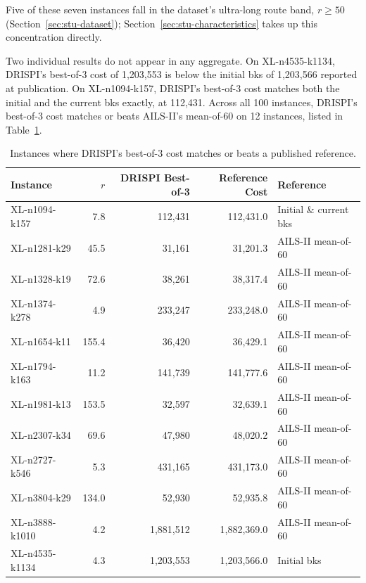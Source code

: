 Five of these seven instances fall in the dataset's ultra-long route band, $r \geq 50$ (Section~\ref{sec:stu-dataset}); Section~\ref{sec:stu-characteristics} takes up this concentration directly.

Two individual results do not appear in any aggregate. On XL-n4535-k1134, DRISPI's best-of-3 cost of 1,203,553 is below the initial \gls{bks} of 1,203,566 \citet{queirogaXLInstancesCapacitated2026} reported at publication. On XL-n1094-k157, DRISPI's best-of-3 cost matches both the initial and the current \gls{bks} exactly, at 112,431. Across all 100 instances, DRISPI's best-of-3 cost matches or beats AILS-II's mean-of-60 on 12 instances, listed in Table~\ref{tab:matches-beats}.

\begin{table}[H]
\centering
\caption{Instances where DRISPI's best-of-3 cost matches or beats a published reference.}
\label{tab:matches-beats}
\begin{tabular}{@{}lrrrl@{}}
\toprule
Instance & $r$ & DRISPI Best-of-3 & Reference Cost & Reference \\
\midrule
XL-n1094-k157 & 7.8 & 112{,}431 & 112{,}431.0 & Initial \& current \gls{bks} \\
XL-n1281-k29 & 45.5 & 31{,}161 & 31{,}201.3 & AILS-II mean-of-60 \\
XL-n1328-k19 & 72.6 & 38{,}261 & 38{,}317.4 & AILS-II mean-of-60 \\
XL-n1374-k278 & 4.9 & 233{,}247 & 233{,}248.0 & AILS-II mean-of-60 \\
XL-n1654-k11 & 155.4 & 36{,}420 & 36{,}429.1 & AILS-II mean-of-60 \\
XL-n1794-k163 & 11.2 & 141{,}739 & 141{,}777.6 & AILS-II mean-of-60 \\
XL-n1981-k13 & 153.5 & 32{,}597 & 32{,}639.1 & AILS-II mean-of-60 \\
XL-n2307-k34 & 69.6 & 47{,}980 & 48{,}020.2 & AILS-II mean-of-60 \\
XL-n2727-k546 & 5.3 & 431{,}165 & 431{,}173.0 & AILS-II mean-of-60 \\
XL-n3804-k29 & 134.0 & 52{,}930 & 52{,}935.8 & AILS-II mean-of-60 \\
XL-n3888-k1010 & 4.2 & 1{,}881{,}512 & 1{,}882{,}369.0 & AILS-II mean-of-60 \\
XL-n4535-k1134 & 4.3 & 1{,}203{,}553 & 1{,}203{,}566.0 & Initial \gls{bks} \\
\bottomrule
\end{tabular}
\end{table}

